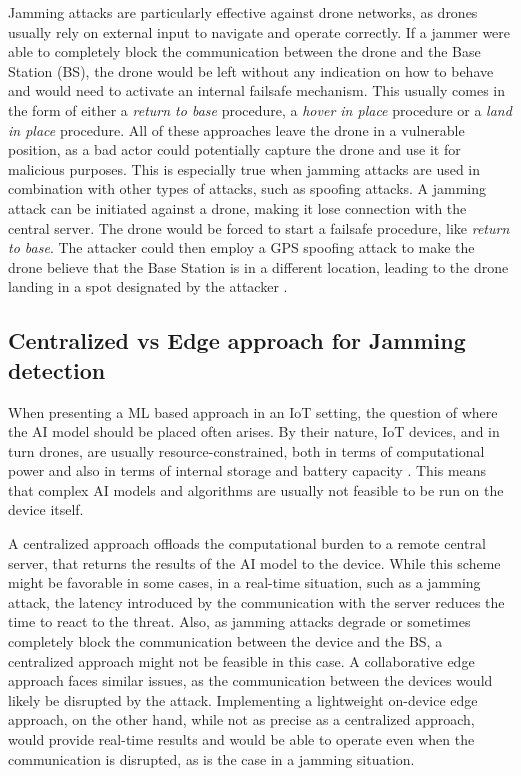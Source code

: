\documentclass[futureinternet,article,submit,pdftex,moreauthors]{Definitions/mdpi}
\begin{document}
Jamming attacks are particularly effective against drone networks, as drones usually rely on external input to navigate and operate correctly.
If a jammer were able to completely block the communication between the drone and the Base Station (BS), the drone would be left without any indication on how to behave and would need to activate an internal failsafe mechanism. 
This usually comes in the form of either a \textit{return to base} procedure, a \textit{hover in place} procedure or a \textit{land in place} procedure.
All of these approaches leave the drone in a vulnerable position, as a bad actor could potentially capture the drone and use it for malicious purposes.
This is especially true when jamming attacks are used in combination with other types of attacks, such as spoofing attacks. A jamming attack can be initiated against a drone, making it lose connection with the central server. 
The drone would be forced to start a failsafe procedure, like \textit{return to base}. The attacker could then employ a GPS spoofing attack to make the drone believe that the Base Station is in a different location, leading to the drone landing in a spot designated by the attacker \cite{RQ170DroneOwano}.

\subsection{Centralized vs Edge approach for Jamming detection}

When presenting a ML based approach in an IoT setting, the question of where the AI model should be placed often arises. By their nature, IoT devices, and in turn drones, are usually resource-constrained, 
both in terms of computational power and also in terms of internal storage and battery capacity \cite{6GSecurity-Chorti}. This means that complex AI models and algorithms are usually not feasible to be run on the device itself. 

A centralized approach offloads the computational burden to a remote central server, that returns the results of the AI model to the device. While this scheme might be favorable in some cases, in a real-time situation, such as a jamming attack, the latency introduced by the
communication with the server reduces the time to react to the threat. Also, as jamming attacks degrade or sometimes completely block the communication between the device and the BS, a centralized approach might not be feasible in this case.
A collaborative edge approach faces similar issues, as the communication between the devices would likely be disrupted by the attack. 
Implementing a lightweight on-device edge approach, on the other hand, while not as precise as a centralized approach, would provide real-time results and would be able to operate even when the communication is disrupted, as is the case in a jamming situation. 
\end{document}
